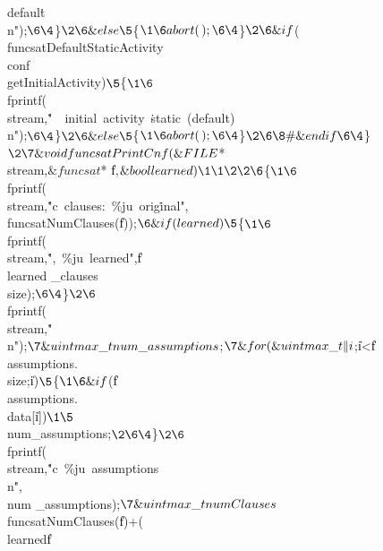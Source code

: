 {{{{{{defaul}\)\.{t\\n"});{}$\6
\4${}\}{}$\2\6
\&{else}\5
${}\{{}$\1\6
\\{abort}(\,);\6
\4${}\}{}$\2\6
\&{if} ${}(\\{funcsatDefaultStaticActivity}\E\\{conf}\MG%
\\{getInitialActivity}){}$\5
${}\{{}$\1\6
${}\\{fprintf}(\\{stream},\.{"\ \ initial\ activity\ }\)\.{static\ (default)%
\\n"});{}$\6
\4${}\}{}$\2\6
\&{else}\5
${}\{{}$\1\6
\\{abort}(\,);\6
\4${}\}{}$\2\6
\8\#\&{endif}\6
\4${}\}{}$\2\7
\&{void} \\{funcsatPrintCnf}(\&{FILE} ${}{*}\\{stream},$\&{funcsat} ${}{*}%
\|f,$\&{bool} \\{learned})\1\1\2\2\6
${}\{{}$\1\6
${}\\{fprintf}(\\{stream},\.{"c\ clauses:\ \%ju\ orig}\)\.{inal"},%
\\{funcsatNumClauses}(\|f));{}$\6
\&{if} (\\{learned})\5
${}\{{}$\1\6
${}\\{fprintf}(\\{stream},\.{",\ \%ju\ learned"},\|f\MG\\{learned%
\_clauses}\MG\\{size});{}$\6
\4${}\}{}$\2\6
${}\\{fprintf}(\\{stream},\.{"\\n"});{}$\7
\&{uintmax\_t} \\{num\_assumptions}${}\K{};{}$\7
\&{for} (\&{uintmax\_t} \|i${}\K{};{}$ ${}\|i<\|f\MG\\{assumptions}.%
\\{size};{}$ ${}\|i\PP){}$\5
${}\{{}$\1\6
\&{if} ${}(\|f\MG\\{assumptions}.\\{data}[\|i]\I{}){}$\1\5
${}\\{num\_assumptions}\PP;{}$\2\6
\4${}\}{}$\2\6
${}\\{fprintf}(\\{stream},\.{"c\ \%ju\ assumptions\\n}\)\.{"},\\{num%
\_assumptions});{}$\7
\&{uintmax\_t} \\{numClauses}${}\K\\{funcsatNumClauses}(\|f)+(\\{learned}\?\|f%
}}}}}
